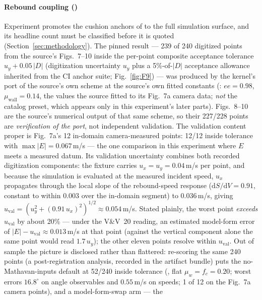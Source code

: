 \paragraph{Rebound coupling ()}
Experiment  promotes the cushion anchors of
\citet{mathavan2010cushion} to the full simulation surface, and its
headline count must be classified before it is quoted
(Section~\ref{sec:methodology}). The pinned result --- 239 of 240
digitized points from the source's Figs.~7--10 inside the per-point
composite acceptance tolerance $u_y + 0.05\,|D|$ (digitization
uncertainty $u_y$ plus a 5\%-of-$|D|$ acceptance allowance inherited from
the CI anchor suite; Fig.~\ref{fig:F9}) --- was produced by the kernel's
port of the source's own scheme at the source's own fitted constants
(: $ee = 0.98$, $\mu_{\mathrm{wall}} =
0.14$, the values the source fitted to its Fig.~7a camera data; \emph{not}
the  catalog preset, which appears only in this
experiment's later parts). Figs.~8--10 are the source's numerical output
of that same scheme, so their 227/228 points are \emph{verification of the
port}, not independent validation. The validation content proper is
Fig.~7a's 12 in-domain camera-measured points: 12/12 inside tolerance
with $\max|E| = 0.067$\,m/s --- the one comparison in this experiment
where $E$ meets a measured datum. Its validation uncertainty combines
both recorded digitization components: the fixture carries $u_x = u_y =
0.04$\,m/s per point, and because the simulation is evaluated at the
measured incident speed, $u_x$ propagates through the local slope of
the rebound-speed response ($\mathrm{d}S/\mathrm{d}V = 0.91$, constant
to within 0.003 over the in-domain segment) to $0.036$\,m/s, giving
$u_{\mathrm{val}} = (u_y^2 + (0.91\,u_x)^2)^{1/2} \approx 0.054$\,m/s.
Stated plainly, the worst point \emph{exceeds} $u_{\mathrm{val}}$ by
about 20\% --- under the V\&V~20 reading, an estimated model-form error
of $|E| - u_{\mathrm{val}} \approx 0.013$\,m/s at that point (against
the vertical component alone the same point would read $1.7\,u_y$);
the other eleven points resolve within $u_{\mathrm{val}}$. Out of sample
the picture is disclosed rather than flattered: re-scoring the same 240
points (a post-registration analysis, recorded in the
artifact bundle) puts the no-Mathavan-inputs default at 52/240
inside tolerance (, flat $\mu_w = f_c = 0.20$;
worst errors $16.8^\circ$ on angle observables and $0.55$\,m/s on speeds;
1 of 12 on the Fig.~7a camera points), and a model-form-swap arm --- the
